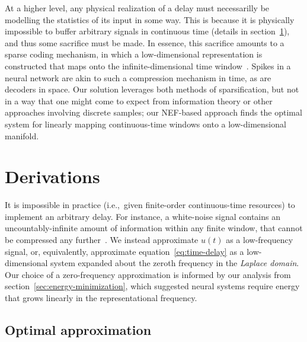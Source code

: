 At a higher level, any physical realization of a delay must necessarilly be modelling the statistics of its input in some way.
This is because it is physically impossible to buffer arbitrary signals in continuous time (details in section~\ref{sec:nef-delay}), and thus some sacrifice must be made.
In essence, this sacrifice amounts to a sparse coding mechanism, in which a low-dimensional representation is constructed that maps onto the infinite-dimensional time window~\citep{blumensath2009sampling}.
Spikes in a neural network are akin to such a compression mechanism in time, as are decoders in space.
Our solution leverages both methods of sparsification, but not in a way that one might come to expect from information theory or other approaches involving discrete samples; our NEF-based approach finds the optimal system for linearly mapping continuous-time windows onto a low-dimensional manifold.

\section{Derivations}
\label{sec:nef-delay}

It is impossible in practice (i.e.,~given finite-order continuous-time resources) to implement an arbitrary delay.
For instance, a white-noise signal contains an uncountably-infinite amount of information within any finite window, that cannot be compressed any further~\citep{cover2012elements}.
We instead approximate $u(t)$ as a low-frequency signal, or, equivalently, approximate equation~\ref{eq:time-delay} as a low-dimensional system expanded about the zeroth frequency in the \emph{Laplace domain}.
Our choice of a zero-frequency approximation is informed by our analysis from section~\ref{sec:energy-minimization}, which suggested neural systems require energy that grows linearly in the representational frequency.

\subsection{Optimal approximation}

